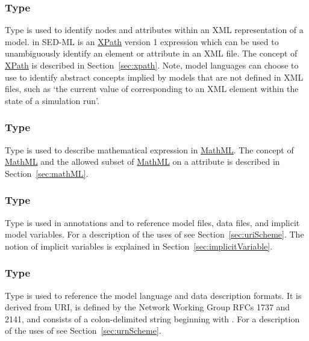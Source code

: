 \subsubsection[\element{XPath}]{Type }
\label{type:xpath}
Type  is  used to identify nodes and attributes within an XML representation of a model.  in SED-ML is an \hyperref[sec:xpath]{XPath} version 1 expression which can be used to unambiguously identify an element or attribute in an XML file. The concept of \hyperref[sec:xpath]{XPath} is described in Section~\ref{sec:xpath}.  Note, model languages can choose to use  to identify abstract concepts implied by models that are not defined in XML files, such as `the current value of corresponding to an XML element within the state of a simulation run'.

\subsubsection[\element{MathML}]{Type }
\label{type:mathml}
Type  is used to describe mathematical expression in \hyperref[sec:mathML]{MathML}. The concept of \hyperref[sec:mathML]{MathML} and the allowed subset of \hyperref[sec:mathML]{MathML} on a  attribute is described in Section~\ref{sec:mathML}.

\subsubsection[\element{anyURI}]{Type }
\label{type:anyURI}
Type  is used in annotations and to reference model files, data files, and implicit model variables. For a description of the uses of  see Section~\ref{sec:uriScheme}.  The notion of implicit variables is explained in Section~\ref{sec:implicitVariable}.

\begin{blockChanged}
\subsubsection[\element{URN}]{Type }
\label{type:urn}
Type  is used to reference the model language and data description formats.  It is derived from URI, is defined by the Network Working Group RFCs 1737 and 2141, and consists of a colon-delimited string beginning with .  For a description of the uses of  see Section~\ref{sec:urnScheme}.
\end{blockChanged}

